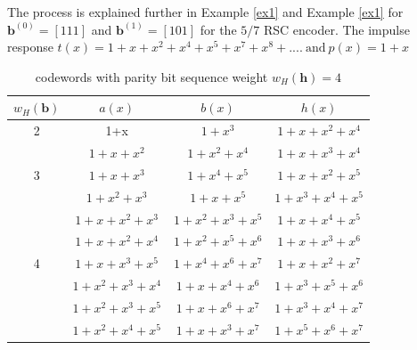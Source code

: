 \documentclass[conference]{IEEEtran}
\begin{document}
 The process is explained further in Example  \ref{ex1}  and Example  \ref{ex1} for $\textbf{b}^{(0)}=[1 1 1]$ and  $\textbf{b}^{(1)}=[ 1 0 1]$ for the $5/7$ RSC encoder. The impulse response $t(x)=1+x+x^2+x^4+x^5+x^7+x^8+....~ \text{and}~p(x)=1+x$
 
 \begin{table}[h!]
 
 \caption{codewords with parity bit sequence weight $w_H(\textbf{h})=4$}
\centering
 \begin{tabular}{c c c c} 
 \hline
 $w_H(\textbf{b})$ & $a(x)$ & $b(x)$ & $h(x)$ \\ [0.5ex] 
 \hline\hline
 2 & 1+x & $1+x^3$ & $1+x+x^2+x^4$\\ 
 \hline 
  & $1+x+x^2$& $1+x^2+x^4$& $1+x+x^3+x^4$ \\
   3 & $1+x+x^3$& $1+x^4+x^5$ & $1+x+x^2+x^5$ \\
  & $1+x^2+x^3$ & $1+x+x^5$ & $1+x^3+x^4+x^5$ \\
  \hline 
  & $1+x+x^2+x^3 $ & $1+x^2+x^3+x^5$ & $1+x+x^4+x^5$ \\
  & $1+x+x^2+x^4 $ & $1+x^2+x^5+x^6$ & $1+x+x^3+x^6$ \\
 4 & $1+x+x^3+x^5 $ & $1+x^4+x^6+x^7$ & $1+x+x^2+x^7$\\ 
  & $1+x^2+x^3+x^4 $ & $1+x+x^4+x^6$ & $1+x^{3}+x^5+x^6$ \\ 
  & $1+x^2+x^3+x^5 $ & $1+x+x^6+x^7$ & $1+x^{3}+x^4+x^7$ \\  
  & $1+x^2+x^4+x^5 $ & $1+x+x^3+x^7$ & $1+x^5+x^6+x^7$ \\ 
 [1ex]
 \hline
 \end{tabular}
 \label{tab2}
\end{table}
\end{document}
